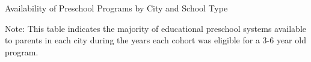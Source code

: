 
\begin{table}[H]
\centering
\caption{Availability of Preschool Programs by City and School Type}\label{tab:itc-pre}
\begin{adjustbox}{width=\textwidth}
\begin{threeparttable}
	
\begin{tablenotes}
Note: This table indicates the majority of educational preschool systems available to parents in each city during the years each cohort was eligible for a 3-6 year old program. 
\end{tablenotes}
\end{threeparttable}
\end{adjustbox}
\end{table}

